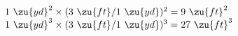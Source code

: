 $1\ \zu{yd}^2\times(3\ \zu{ft}/1\ \zu{yd})^2=9\ \zu{ft}^2$\\
$1\ \zu{yd}^3\times(3\ \zu{ft}/1\ \zu{yd})^3=27\ \zu{ft}^3$



